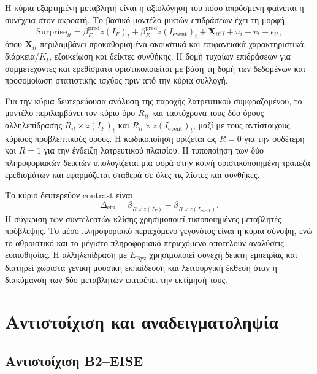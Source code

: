 \documentclass[11pt,a4paper]{article}
\begin{document}
Η κύρια εξαρτημένη μεταβλητή είναι η αξιολόγηση του πόσο απρόσμενη φαίνεται η συνέχεια στον ακροατή. Το βασικό μοντέλο μικτών επιδράσεων έχει τη μορφή
\[
\mathrm{Surprise}_{it}=\beta_F^{\mathrm{pred}} z(I_F)_t+\beta_E^{\mathrm{pred}} z(I_{\mathrm{event}})_t+\mathbf X_{it}\gamma+u_i+v_t+\epsilon_{it},
\]
όπου $\mathbf X_{it}$ περιλαμβάνει προκαθορισμένα ακουστικά και επιφανειακά χαρακτηριστικά, διάρκεια/$K_t$, εξοικείωση και δείκτες συνθήκης. Η δομή τυχαίων επιδράσεων για συμμετέχοντες και ερεθίσματα οριστικοποιείται με βάση τη δομή των δεδομένων και προσομοίωση στατιστικής ισχύος πριν από την κύρια συλλογή.

Για την κύρια δευτερεύουσα ανάλυση της παροχής λατρευτικού συμφραζομένου, το μοντέλο περιλαμβάνει τον κύριο όρο $R_{it}$ και ταυτόχρονα τους δύο όρους αλληλεπίδρασης $R_{it}\times z(I_F)_t$ και $R_{it}\times z(I_{\mathrm{event}})_t$, μαζί με τους αντίστοιχους κύριους προβλεπτικούς όρους. Η κωδικοποίηση ορίζεται ως $R=0$ για την ουδέτερη και $R=1$ για την ένδειξη λατρευτικού πλαισίου. Η τυποποίηση των δύο πληροφοριακών δεικτών υπολογίζεται μία φορά στην κοινή οριστικοποιημένη τράπεζα ερεθισμάτων και εφαρμόζεται σταθερά σε όλες τις λίστες και συνθήκες.

Το κύριο δευτερεύον contrast είναι
\[
\Delta_{\mathrm{ctx}}=\beta_{R\times z(I_F)}-\beta_{R\times z(I_{\mathrm{event}})}.
\]
Η σύγκριση των συντελεστών κλίσης χρησιμοποιεί τυποποιημένες μεταβλητές πρόβλεψης. Το μέσο πληροφοριακό περιεχόμενο γεγονότος είναι η κύρια σύνοψη, ενώ το αθροιστικό και το μέγιστο πληροφοριακό περιεχόμενο αποτελούν αναλύσεις ευαισθησίας. Η αλληλεπίδραση με $E_{\mathrm{Byz}}$ χρησιμοποιεί συνεχή δείκτη εμπειρίας και διατηρεί χωριστά γενική μουσική εκπαίδευση και λειτουργική έκθεση όταν η διακύμανση των δύο μεταβλητών επιτρέπει την εκτίμησή τους.

\section{Αντιστοίχιση και αναδειγματοληψία}\label{app:matching}

\subsection{Αντιστοίχιση B2--EISE}\label{app:match-b2}
\end{document}
